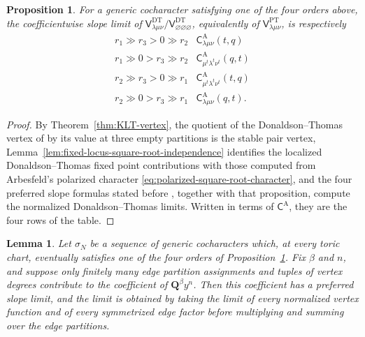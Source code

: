 \documentclass{amsart}
\newtheorem{proposition}{Proposition}
\newtheorem{lemma}{Lemma}
\theoremstyle{definition}
\numberwithin{equation}{section}
\begin{document}
\begin{proposition}
\label{prop:chart-slope-limit}
For a generic cocharacter satisfying one of the four orders above, the coefficientwise slope limit of \(\mathsf V^{\mathrm{DT}}_{\lambda\mu\nu}/ \mathsf V^{\mathrm{DT}}_{\varnothing\varnothing\varnothing}\), equivalently of \(\mathsf V^{\mathrm{PT}}_{\lambda\mu\nu}\), is respectively
\begin{equation*}
\begin{array}{c|c}
 r_1\gg r_3>0\gg r_2&
 \mathsf C^{\mathrm A}_{\lambda\mu\nu}(t,q)\\
 r_1\gg0>r_3\gg r_2&
 \mathsf C^{\mathrm A}_{\mu^t\lambda^t\nu^t}(q,t)\\
 r_2\gg r_3>0\gg r_1&
 \mathsf C^{\mathrm A}_{\mu^t\lambda^t\nu^t}(t,q)\\
 r_2\gg0>r_3\gg r_1&
 \mathsf C^{\mathrm A}_{\lambda\mu\nu}(q,t).
\end{array}
\end{equation*}
\end{proposition}

\begin{proof}
By Theorem~\ref{thm:KLT-vertex}, the quotient of the Donaldson--Thomas vertex of \cite{KuhnLiuThimm} by its value at three empty partitions is the stable pair vertex, Lemma~\ref{lem:fixed-locus-square-root-independence} identifies the localized Donaldson--Thomas fixed point contributions with those computed from Arbesfeld's polarized character \eqref{eq:polarized-square-root-character}, and the four preferred slope formulas stated before \cite[Proposition~4.6]{Arbesfeld}, together with that proposition, compute the normalized Donaldson--Thomas limits.  Written in terms of \(\mathsf C^{\mathrm A}\), they are the four rows of the table.
\end{proof}

\begin{lemma}
\label{lem:global-preferred-slope-limit}
Let \(\sigma_N\) be a sequence of generic cocharacters which, at every toric chart, eventually satisfies one of the four orders of Proposition~\ref{prop:chart-slope-limit}.  Fix \(\beta\) and \(n\), and suppose only finitely many edge partition assignments and tuples of vertex degrees contribute to the coefficient of \(\mathbf Q^\beta y^n\).  Then this coefficient has a preferred slope limit, and the limit is obtained by taking the limit of every normalized vertex function and of every symmetrized edge factor before multiplying and summing over the edge partitions.
\end{lemma}
\end{document}
